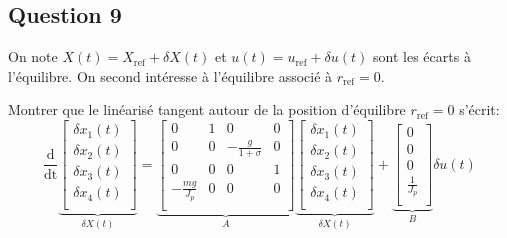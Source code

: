 \documentclass[class=article, crop=false]{standalone}
\begin{document}
\subsection{Question 9}\label{Q9}
On note $X(t) = X_{\text{ref}} + \delta X(t)$ et $u(t) = u_{\text{ref}} + \delta u(t)$ sont les écarts à l'équilibre. On second intéresse à l'équilibre associé à $r_{\text{ref}} = 0$.
\begin{exercise}
    Montrer que le linéarisé tangent autour de la position d'équilibre $r_{\text{ref}} = 0$ s'écrit:
    \begin{equation}
        \frac{\text{d}}{\text{dt}} 
        \underbrace{
        \begin{bmatrix}
            \delta x_{1}(t)\\
            \delta x_{2}(t)\\
            \delta x_{3}(t)\\
            \delta x_{4}(t)\\
        \end{bmatrix}}_{\delta X(t)}
        =
        \underbrace{
            \begin{bmatrix}
            0 & 1 & 0 & 0\\
            0 & 0 & -\frac{g}{1 + \sigma} & 0\\
            0 & 0 & 0 & 1\\
            -\frac{mg}{J_p} & 0 & 0 & 0\\
        \end{bmatrix}}_{A}
        \underbrace{
        \begin{bmatrix}
            \delta x_{1}(t)\\
            \delta x_{2}(t)\\
            \delta x_{3}(t)\\
            \delta x_{4}(t)\\
        \end{bmatrix}}_{\delta X(t)}
        +
        \underbrace{
            \begin{bmatrix}
            0\\
            0\\
            0\\
            \frac{1}{J_p}\\
        \end{bmatrix}}_{B}
        \delta u(t)
    \end{equation}
\end{exercise}
\end{document}
